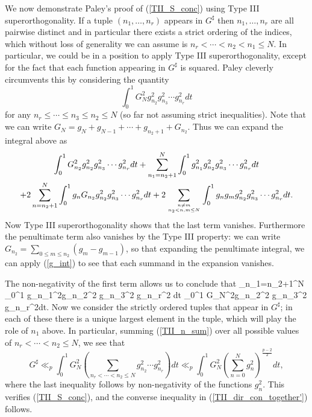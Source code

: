 \documentclass[oneside,11pt]{amsart}
\begin{document}
We now demonstrate Paley's proof of  (\ref{TII_S_conc})   using Type III superorthogonality. 
If a tuple $(n_1, \ldots, n_r)$ appears in $G^\sharp$ then $n_1, \ldots, n_r$ are all pairwise distinct and in particular there exists a strict ordering of the indices, which without loss of generality we can assume is $n_r < \cdots < n_2 < n_1 \leq N$. In particular, we  could be in a position to apply Type III superorthogonality, except for the fact that each function appearing in $G^\sharp$ is squared. Paley cleverly circumvents this by considering the quantity
\[ \int_0^1 G_N^2 g_{n_2}^2 g_{n_3}^2 \cdots g_{n_{r}}^2  dt\]
for any $n_r  \leq \cdots  \leq n_3 \leq n_2 \leq N$ (so far not assuming strict inequalities). 
Note that we can write $G_N = g_{N} + g_{N-1} + \cdots  + g_{n_2+1} + G_{n_2}$. Thus we can expand the integral above as
\begin{multline*}
 \int_0^1 G_{n_2}^2 g_{n_2}^2 g_{n_3}^2 \cdots g_{n_{r}}^2  dt
 	+ 
\sum_{n_1=n_2+1}^{N}	 \int_0^1g_{n_1}^2 g_{n_2}^2 g_{n_3}^2 \cdots g_{n_{r}}^2  dt
	 \\
	+ 2 \sum_{n=n_2+1}^{N} \int_0^1  g_{n} G_{n_2} g_{n_2}^2 g_{n_3}^2 \cdots g_{n_{r}}^2dt
	  + 2 \sum_{n \neq m \atop n_2 < n,m \leq N} \int_0^1 g_ng_m g_{n_2}^2 g_{n_3}^2 \cdots g_{n_{r}}^2 dt.
\end{multline*}
Now Type III superorthogonality shows that the last term vanishes. Furthermore the penultimate term also vanishes by the Type III property:
  we can write  
$G_{n_2}= \sum_{0 \leq m \leq n_2} (g_m-g_{m-1})$, so that expanding the penultimate integral, we can apply (\ref{g_int}) to see that each summand in the expansion vanishes.
 
 
The non-negativity of the first term allows us to conclude that 
\beq\label{TII_n_sum}
 \sum_{n_1=n_2+1}^{N}	 \int_0^1  g_{n_1}^2g_{n_2}^2 g_{n_3}^2 \cdots g_{n_{r}}^2 dt \leq  \int_0^1  G_N^2g_{n_2}^2 g_{n_3}^2 \cdots g_{n_{r}}^2dt.
 \eeq
Now we consider the strictly ordered tuples that appear in $G^\sharp$; in each of these there is a unique largest element in the tuple, which will play the role of $n_1$ above. In particular, summing (\ref{TII_n_sum}) over all possible values of $n_r < \cdots < n_2 \leq N$, 
we see that 
\[ G^\sharp \ll_p \int_0^1 G_N^2 (  \sum_{n_r < \cdots < n_2 \leq N}g_{n_2}^2 \cdots g_{n_r}^2 ) dt \ll_p \int_0^1 G_N^2 ( \sum_{n=0}^{N} g_n^2)^{\frac{p-2}{2}} dt,
\]
where the last inequality follows by   non-negativity of the functions $g_n^2$. 
This verifies (\ref{TII_S_conc}), and the   converse inequality in (\ref{TII_dir_con_together'}) follows.
\end{document}
